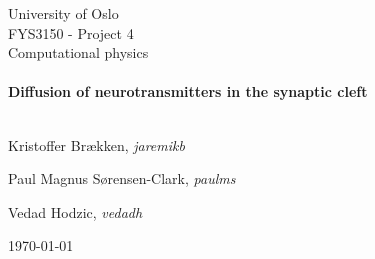 
\begin{center}
    \LARGE University of Oslo\\[1.5cm]
    \Large FYS3150 - Project 4 \\ Computational physics\\[0.5cm]

    \HRule \\[0.4cm]

    { \huge \bfseries Diffusion of neurotransmitters in the synaptic cleft \\[0.4cm] }

    \HRule \\[1.5cm]

    \large Kristoffer Brækken, \emph{jaremikb}

    \large Paul Magnus Sørensen-Clark, \emph{paulms}

    \large Vedad Hodzic, \emph{vedadh}

    \vfill

    {\large \today}
\end{center}
